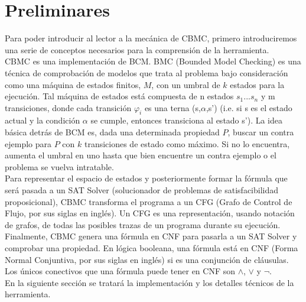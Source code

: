 \documentclass{llncs}
\begin{document}
\section{Preliminares}
    Para poder introducir al lector a la mecánica de CBMC, primero
    introduciremos una serie de conceptos necesarios para la comprensión de la
    herramienta.\\ \indent
    CBMC es una implementación de BCM. BMC \cite{bmcpaper}(Bounded Model
    Checking) es una técnica de comprobación de modelos que trata al problema
    bajo consideración como una máquina de estados finitos, $M$, con un umbral
    de $k$ estados para la ejecución. Tal máquina de estados está compuesta de n
    estados $s_{1}$...$s_{n}$ y m transiciones, donde cada transición
    $\varphi_{i}$ es una terna (s,$\alpha$,s') (i.e. si s es el estado actual y
    la condición $\alpha$ se cumple, entonces transiciona al estado s').  La
    idea básica detrás de BCM es, dada una determinada propiedad $P$, buscar un
    contra ejemplo para $P$ con $k$ transiciones de estado como máximo. Si no lo
    encuentra, aumenta el umbral en uno hasta que bien encuentre un contra
    ejemplo o el problema se vuelva intratable.\\
    \indent Para representar el espacio de estados y posteriormente formar la
    fórmula que será pasada a un SAT Solver (solucionador de problemas de
    satisfacibilidad proposicional), CBMC transforma el programa a un
    CFG (Grafo de Control de Flujo, por sus siglas en inglés). Un CFG es una
    representación, usando notación de grafos, de todas las posibles trazas
    de un programa durante su ejecución.\\
    \indent Finalmente, CBMC genera una fórmula en CNF para pasarla a un
    SAT Solver y comprobar una propiedad.  En lógica booleana, una fórmula está
    en CNF (Forma Normal Conjuntiva, por sus siglas en inglés) si es una
    conjunción de cláusulas. Los únicos conectivos que una fórmula puede tener
    en CNF son $\wedge$, $\vee$ y $\neg$.\\
    \indent En la siguiente sección se tratará la implementación y los detalles
    técnicos de la herramienta.\\

\end{document}
